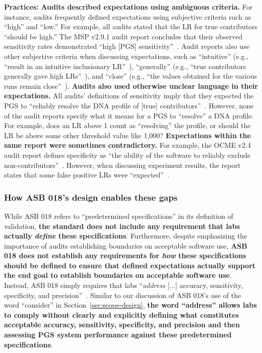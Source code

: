\textbf{Practices: }\textbf{Audits described expectations using ambiguous criteria.} For instance, audits frequently defined expectations using subjective criteria such as ``high'' and ``low.'' For example, all audits stated that the LR for true contributors ``should be high.'' The MSP v2.9.1 audit report concludes that their observed sensitivity rates demonstrated ``high [PGS] sensitivity''~\cite[p.23]{mspIV}. Audit reports also use other subjective criteria when discussing expectations, such as ``intuitive'' (e.g., ``result in an intuitive inclusionary LR''~\cite[p.7]{ocmeIV2.7}), ``generally'' (e.g., ``true contributors generally gave high LRs''~\cite[p.21]{ocmeIV2.7}), and ``close'' (e.g., ``the values obtained for the various runs remain close''~\cite[p.19]{ocmeIV}). \textbf{Audits also used otherwise unclear language in their expectations.} All audits' definitions of sensitivity imply that they expected the PGS to ``reliably resolve the DNA profile of [true] contributors''~\cite{ocmeIV, ocmeIV2.7, pbsoIV, mspIV, cbiIV}. However, none of the audit reports specify what it means for a PGS to ``resolve'' a DNA profile. For example, does an LR above 1 count as ``resolving'' the profile, or should the LR be above some other threshold value like 1,000? \textbf{Expectations within the same report were sometimes contradictory.} For example, the OCME v2.4 audit report defines specificity as ``the ability of the software to reliably exclude non-contributors''~\cite[p.6]{ocmeIV}. However, when discussing experiment results, the report states that some false positive LRs were ``expected''~\cite[p.14]{ocmeIV}. 


\subsubsection{How ASB 018's design enables these gaps}
\label{sec:stds-design}
While ASB 018 refers to ``predetermined specifications'' in its definition of validation, \textbf{the standard does not include any requirement that labs actually \textit{define} these specifications}. Furthermore, despite emphasizing the importance of audits establishing boundaries on acceptable software use, \textbf{ASB 018 does not establish any requirements for \textit{how} these specifications should be defined to ensure that defined expectations actually support the end goal to establish boundaries on acceptable software use}. Instead, ASB 018 simply requires that labs ``\textit{address} [...] accuracy, sensitivity, specificity, and precision''~\cite[emph. added]{asb018}. Similar to our discussion of ASB 018's use of the word ``consider'' in Section~\ref{sec:scope-design}, \textbf{the word ``address'' allows labs to comply without clearly and explicitly defining what constitutes acceptable accuracy, sensitivity, specificity, and precision and then assessing PGS system performance against these predetermined specifications}. 



